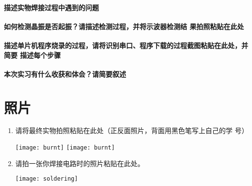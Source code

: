 \documentclass{swfulabreport}
\begin{document}
\zhlipsum[1-2]

\subsubsection{描述实物焊接过程中遇到的问题}

\zhlipsum[3-4]

\subsubsection{如何检测晶振是否起振？请描述检测过程，并将示波器检测结
  果拍照粘贴在此处}

\zhlipsum[5-6]

\subsubsection{描述单片机程序烧录的过程，请将识别串口、程序下载的过程截图粘贴在此处，并简要
描述每个步骤}

\zhlipsum[7-8]

\subsubsection{本次实习有什么收获和体会？请简要叙述}

\zhlipsum[9-10]



\chapter{照片}

\begin{enumerate}
\item 请将最终实物拍照粘贴在此处（正反面照片，背面用黑色笔写上自己的学
  号）

  \begin{center}
    \texttt{[image: burnt]}\qquad
    \texttt{[image: burnt]}
  \end{center}

\item 请拍一张你焊接电路时的照片粘贴在此处。

  \begin{center}
    \texttt{[image: soldering]}
  \end{center}

\end{enumerate}
\end{document}
